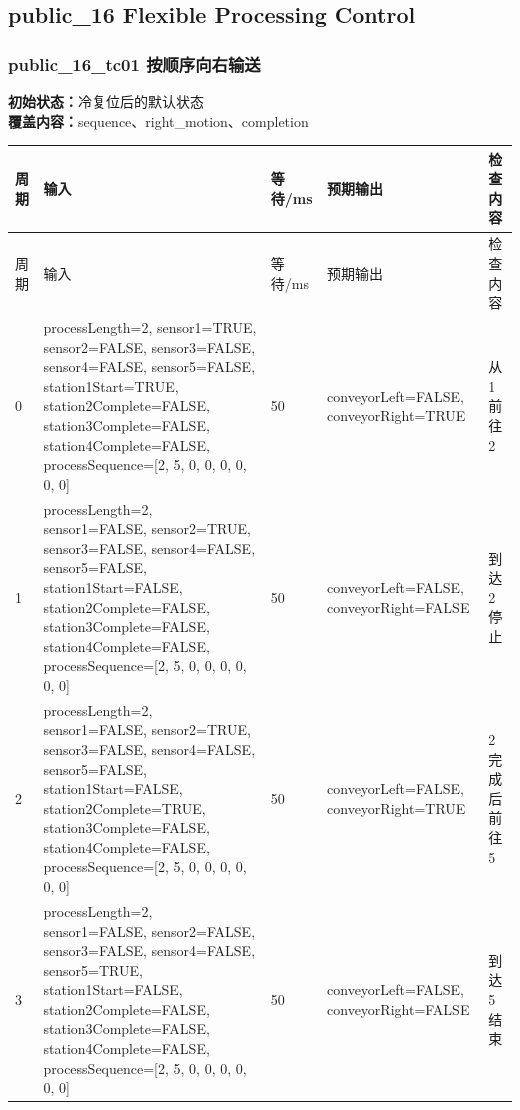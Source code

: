 \subsection{{\ttfamily public\_16} Flexible Processing Control}

\subsubsection{{\ttfamily public\_16\_tc01} 按顺序向右输送}

\noindent\textbf{初始状态：}冷复位后的默认状态\\

\textbf{覆盖内容：}sequence、right\_motion、completion

\begin{longtable}{L{1.0cm}L{4.7cm}L{1.4cm}L{4.0cm}L{2.1cm}}

\toprule

周期 & 输入 & 等待/ms & 预期输出 & 检查内容\\

\midrule

\endfirsthead

\toprule

周期 & 输入 & 等待/ms & 预期输出 & 检查内容\\

\midrule

\endhead

0 & processLength=2, sensor1=TRUE, sensor2=FALSE, sensor3=FALSE, sensor4=FALSE, sensor5=FALSE, station1Start=TRUE, station2Complete=FALSE, station3Complete=FALSE, station4Complete=FALSE, processSequence=[2, 5, 0, 0, 0, 0, 0, 0] & 50 & conveyorLeft=FALSE, conveyorRight=TRUE & 从 1 前往 2\\

1 & processLength=2, sensor1=FALSE, sensor2=TRUE, sensor3=FALSE, sensor4=FALSE, sensor5=FALSE, station1Start=FALSE, station2Complete=FALSE, station3Complete=FALSE, station4Complete=FALSE, processSequence=[2, 5, 0, 0, 0, 0, 0, 0] & 50 & conveyorLeft=FALSE, conveyorRight=FALSE & 到达 2 停止\\

2 & processLength=2, sensor1=FALSE, sensor2=TRUE, sensor3=FALSE, sensor4=FALSE, sensor5=FALSE, station1Start=FALSE, station2Complete=TRUE, station3Complete=FALSE, station4Complete=FALSE, processSequence=[2, 5, 0, 0, 0, 0, 0, 0] & 50 & conveyorLeft=FALSE, conveyorRight=TRUE & 2 完成后前往 5\\

3 & processLength=2, sensor1=FALSE, sensor2=FALSE, sensor3=FALSE, sensor4=FALSE, sensor5=TRUE, station1Start=FALSE, station2Complete=FALSE, station3Complete=FALSE, station4Complete=FALSE, processSequence=[2, 5, 0, 0, 0, 0, 0, 0] & 50 & conveyorLeft=FALSE, conveyorRight=FALSE & 到达 5 结束\\

\bottomrule

\end{longtable}

